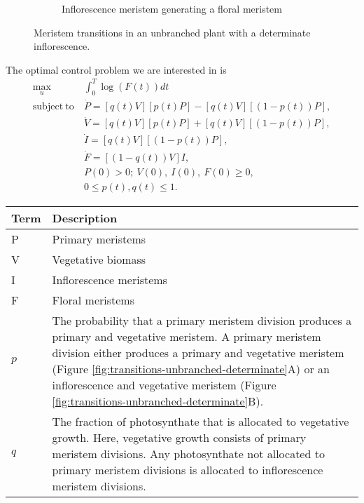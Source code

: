 \documentclass[12pt, oneside]{article}   	%
\begin{document}
\begin{figure}[hbt!]
\begin{subfigure}{.25\textwidth}
    \caption{Inflorescence meristem generating a floral meristem}
  \end{subfigure}
        \caption{Meristem transitions in an unbranched plant with a determinate inflorescence.}
    \label{fig:transitions-determinate}
\end{figure}


The optimal control problem we are interested in is
%
\begin{align}
\max_{u} &  \int_0^T  \log( F(t) ) dt  \nonumber \\
\mathrm{subject\ to\ } 
& \dot{P} = [q(t) V] [p(t) P] - [q(t) V] [(1 - p(t)) P ] , \nonumber \\
& \dot{V} = [q(t) V] [ p(t) P]  + [q(t) V] [(1 - p(t)) P] , \nonumber \\ 
& \dot{I} = [q(t) V] [( 1-p(t) ) P], \nonumber \\ 
& \dot{F} = [(1-q(t)) V] I , \nonumber \\ 
& P(0) > 0;\ V(0),\ I(0),\ F(0) \geq 0, \nonumber \\
& 0 \leq p(t), q(t) \leq 1.  
\end{align}
%
\begin{table}[hbt!]
\footnotesize
\begin{tabularx}{\linewidth}{|l|X|}
\hline
\textbf{Term} & \textbf{Description} \\ \hline
 P    & Primary meristems            \\ \hline
 V   &  Vegetative biomass         \\ \hline
 I   &  Inflorescence meristems          \\ \hline
 F   &  Floral meristems          \\ \hline
 $p$  &  The probability that a primary meristem division produces a primary and vegetative meristem. A primary meristem division either produces a primary and vegetative meristem (Figure \ref{fig:transitions-unbranched-determinate}A) or an inflorescence and vegetative meristem (Figure \ref{fig:transitions-unbranched-determinate}B).      \\ \hline
 $q$   &  The fraction of photosynthate that is allocated to vegetative growth. Here, vegetative growth consists of primary meristem divisions. Any photosynthate not allocated to primary meristem divisions is allocated to inflorescence meristem divisions.         \\ \hline
\end{tabularx}
\end{table}
\end{document}
